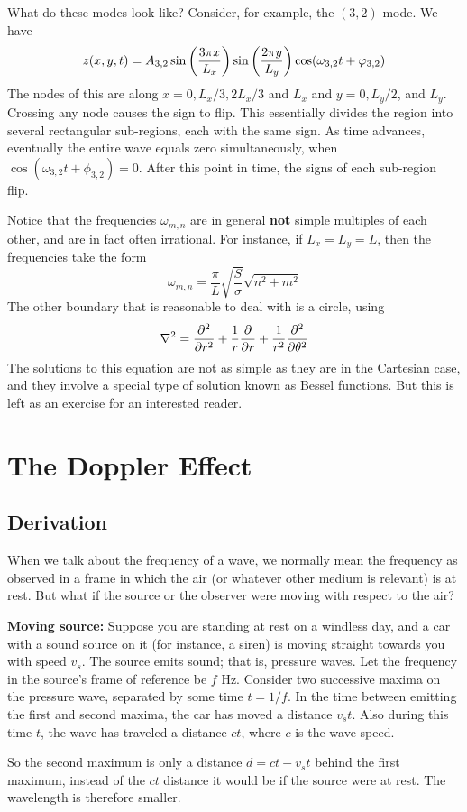 What do these modes look like? Consider, for example, the $(3,2)$ mode. We have
\[ z(x,y,t) = A_{3,2}\sin\pqty{\frac{3\pi x}{L_x}}\sin\pqty{\frac{2\pi y}{L_y}} \cos(\omega_{3,2}t + \phi_{3,2}) \]
The nodes of this are along $x = 0, L_x/3, 2L_x/3$ and $L_x$ and $y = 0, L_y/2$, and $L_y$. Crossing any node causes the sign to flip. This essentially divides the region into several rectangular sub-regions, each with the same sign. As time advances, eventually the entire wave equals zero simultaneously, when $\cos(\omega_{3,2}t + \phi_{3,2}) = 0$. After this point in time, the signs of each sub-region flip.

Notice that the frequencies $\omega_{m,n}$ are in general \textbf{not} simple multiples of each other, and are in fact often irrational. For instance, if $L_{x}=L_{y} = L$, then the frequencies take the form
\[ \omega_{m,n} = \frac{\pi}{L}\sqrt{\frac{S}{\sigma}} \sqrt{n^2+m^2} \]
The other boundary that is reasonable to deal with is a circle, using
\[ \nabla^2 = \pdv[2]{r} + \frac{1}{r}\pdv{r} + \frac{1}{r^2}\pdv[2]{\theta} \]
The solutions to this equation are not as simple as they are in the Cartesian case, and they involve a special type of solution known as Bessel functions. But this is left as an exercise for an interested reader. 
\section{The Doppler Effect}
\subsection*{Derivation}
When we talk about the frequency of a wave, we normally mean the frequency as observed in a frame in which the air (or whatever other medium is relevant) is at rest. But what if the source or the observer were moving with respect to the air?

\textbf{Moving source:} Suppose you are standing at rest on a windless day, and a car with a sound source on it (for instance, a siren) is moving straight towards you with speed $v_s$. The source emits sound; that is, pressure waves. Let the frequency in the source's frame of reference be $f$ Hz. Consider two successive maxima on the pressure wave, separated by some time $t=1/f$. In the time between emitting the first and second maxima, the car has moved a distance $v_st$. Also during this time $t$, the wave has traveled a distance $ct$, where $c$ is the wave speed. 

So the second maximum is only a distance $d = ct - v_st$ behind the first maximum, instead of the $ct$ distance it would be if the source were at rest. The wavelength is therefore smaller. 

